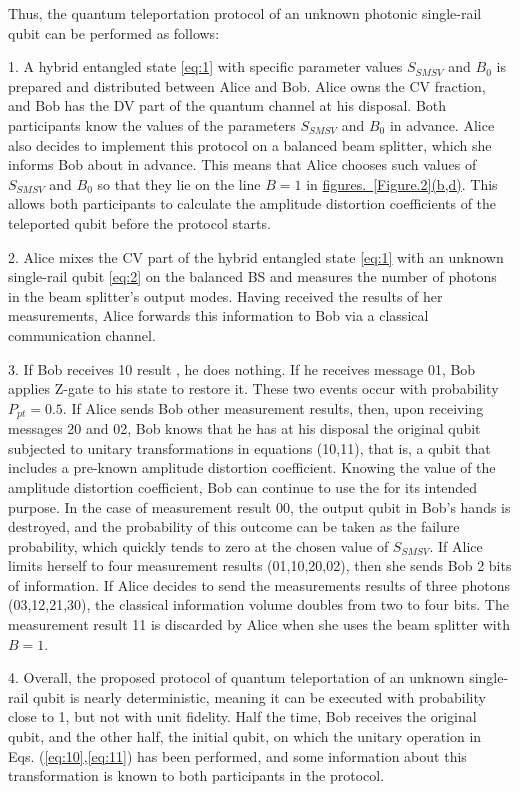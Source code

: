 \documentclass{optica-article}
\begin{document}
\par Thus, the quantum teleportation protocol of an unknown photonic single-rail qubit can be performed as follows:
\par 1. A hybrid entangled state \ref{eq:1}  with specific parameter values $S_{SMSV}$ and $B_0$ is prepared and distributed between Alice and Bob. Alice owns the CV fraction, and Bob has the DV part of the quantum channel at his disposal. Both participants know the values of the parameters $S_{SMSV}$ and $B_0$ in advance. Alice also decides to implement this protocol on a balanced beam splitter, which she informs Bob about in advance. This means that Alice chooses such values of $S_{SMSV}$ and $B_0$ so that they lie on the line $B=1$ in \hyperref[Figure.2]{figures.~\ref*{Figure.2}(b,d)}. This allows both participants to calculate the amplitude distortion coefficients of the teleported qubit before the protocol starts.
\par 2. Alice mixes the CV part of the hybrid entangled state \eqref{eq:1}  with an unknown single-rail qubit \eqref{eq:2}  on the balanced BS and measures the number of photons in the beam splitter's output modes. Having received the results of her measurements, Alice forwards this information to Bob via a classical communication channel. 
\par 3. If Bob receives 10 result , he does nothing. If he receives message 01, Bob applies Z-gate to his state to restore it. These two events occur with probability $P_{pt}=0.5$. If Alice sends Bob other measurement results, then, upon receiving messages 20 and 02, Bob knows that he has at his disposal the original qubit subjected to unitary transformations in equations (10,11), that is, a qubit that includes a pre-known amplitude distortion coefficient. Knowing the value of the amplitude distortion coefficient, Bob can continue to use the for its intended purpose. In the case of measurement result 00, the output qubit in Bob's hands is destroyed, and the probability of this outcome can be taken as the failure probability, which quickly tends to zero at the chosen value of $S_{SMSV}$. If Alice limits herself to four measurement results (01,10,20,02), then she sends Bob 2 bits of information. If Alice decides to send the measurements results of three photons (03,12,21,30), the classical information volume doubles from two to four bits. The measurement result 11 is discarded by Alice when she uses the beam splitter with $B=1$.    
\par 4. Overall, the proposed protocol of quantum teleportation of an unknown single-rail qubit is nearly deterministic, meaning it can be executed with probability close to 1, but not with unit fidelity. Half the time, Bob receives the original qubit, and the other half, the initial qubit, on which the unitary operation in Eqs. (\ref{eq:10},\ref{eq:11}) has been performed, and some information about this transformation is known to both participants in the protocol.
\end{document}
